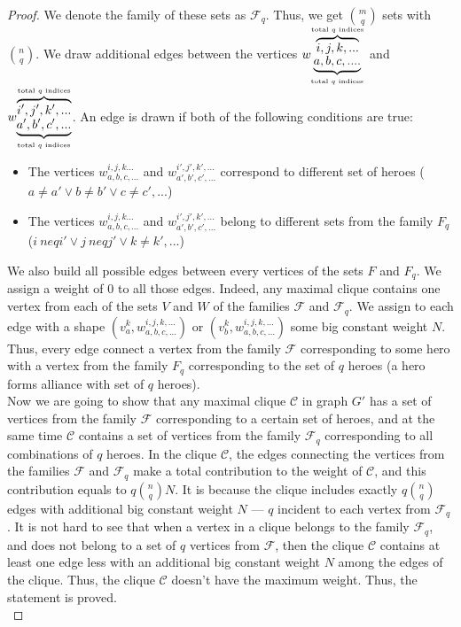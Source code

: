 \documentclass[smallextended]{svjour3}       %
\begin{document}
\begin{proof}
    We denote the family of these sets as $ \mathcal {F} _q $. Thus, we get $ \binom{m}{q} $ sets with $ \binom{n}{q} $.
    We draw additional edges between the vertices $w_{\underbrace{a, b, c, ....}_\text{total $ q $ indices}}^{\overbrace{i, j, k , ...}^\text{total $ q $ indices}} $ and $w_{\underbrace{a',b', c', ...}_\text{total $ q $ indices}}^{\overbrace {i ', j', k ', ...}^\text{total $ q $ indices}}$. An edge is drawn if both of the following conditions are true:
    \begin{itemize}
        \item The vertices $w_{a, b, c, ...}^{i, j, k ...} $ and $ w_ {a', b', c', ...}^{i', j', k', ...}$ correspond to different set of heroes ($ a \neq a '\lor b \neq b' \lor c \neq c', ... $)
        \item The vertices $ w_{a, b, c, ...}^ {i, j, k ...} $ and $ w_{a', b', c',...}^{i', j', k', ...} $ belong to different sets from the family $ F_q $ ($ i \ neq i'\lor j \ neq j' \lor k \neq k', ... $)
    \end {itemize}
    We also build all possible edges between every vertices of the sets $ F $ and $ F_q $. We assign a weight of 0 to all those edges. Indeed, any maximal clique contains one vertex from each of the sets $ V $ and $ W $ of the families $\mathcal {F}$ and $\mathcal {F}_q$. We assign to each edge with a shape $ (v_a^k, w_ {a, b, c, ...}^ {i, j, k, ...}) $ or $ (v_b^k, w_{a, b, c , ...}^{i, j, k, ...}) $ some big constant weight $ N $. Thus, every edge connect a vertex from the family $ \mathcal{F} $ corresponding to some hero with a vertex from the family $ F_q $ corresponding to the set of $ q $ heroes (a hero forms alliance with set of $q$ heroes).\\
     Now we are going to show that any maximal clique $\mathcal{C}$ in graph $G'$ has a set of vertices from the family $\mathcal{F}$ corresponding to a certain set of heroes, and at the same time $\mathcal{C}$ contains a set of vertices from the family $ \mathcal{F}_q $ corresponding to all combinations of $q$ heroes. In the clique $\mathcal{C}$, the edges connecting the vertices from the families $ \mathcal{F} $ and $ \mathcal{F}_q $ make a total contribution to the weight of $\mathcal{C}$, and this contribution equals to $ q \binom{n}{q} N $. It is because the clique includes exactly $ q \binom{n}{q} $ edges with additional big constant weight $N$ --- $q$ incident to each vertex from $ \mathcal {F}_q $.  It is not hard to see that when a vertex in a clique belongs to the family $ \mathcal{F}_q $, and does not belong to a set of $q$ vertices from $ \mathcal {F} $, then the clique $\mathcal{C}$ contains at least one edge less with an additional big constant weight $ N $ among the edges of the clique. Thus, the clique $\mathcal{C}$ doesn't have the maximum weight. Thus, the statement is proved. \\

\end{proof}
\end{document}
